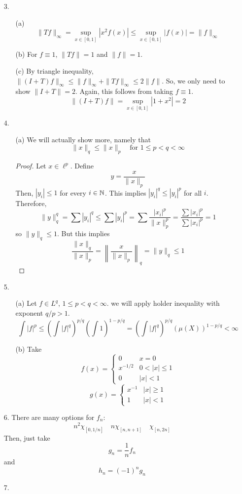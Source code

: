 \begin{itemize}

\item[3.]
	\begin{itemize}
		\item[(a)]
			\[ \|Tf\|_\infty = \sup_{x \in [0,1]} |x^2f(x)| \le \sup_{x \in [0,1]} |f(x)| = \|f\|_\infty \]
		\item[(b)]
			For $f \equiv 1$, $\|Tf\|=1$ and $\|f\|=1$.
		\item[(c)] By triangle inequality, $\|(I+T)f\|_\infty \le \|f\|_\infty + \|Tf\|_\infty \le 2\|f\|$. So, we only need to show $\|I+T\|=2$. Again, this follows from taking $f \equiv 1$.
			\[ \|(I+T)f\| = \sup_{x \in [0,1]} |1+x^2| = 2 \]
	\end{itemize}

\item[4.]
	\begin{itemize}
		\item[(a)] We will actually show more, namely that 
				\[ \|x\|_q \le \|x\|_p \quad \mbox{for } 1 \le p<q<\infty \]
		\begin{proof}
		Let $x \in \ell^p$. Define
			\[ y = \dfrac{x}{\|x\|_p} \]
		Then, $|y_i| \le 1$ for every $i \in \mathbb{N}$. This implies $|y_i|^q \le |y_i|^p$ for all $i$. Therefore,
			\[ \|y\|_q^q =\sum |y_i|^q \le \sum |y_i|^p = \sum \dfrac{|x_i|^p}{\|x\|_p^p} = \dfrac{\sum |x_i|^p}{\sum |x_i|^p} =1\]
		so $\|y\|_q\le1$. But this implies
			\[ \dfrac{\|x\|_q}{\|x\|_p} = \left\| \dfrac{x}{\|x\|_p} \right\|_q = \|y\|_q \le 1 \]
		\end{proof}
	\end{itemize}

\item[5.]
	\begin{itemize}
		\item[(a)] Let $f \in L^q$, $1 \le p < q < \infty$. we will apply holder inequality with exponent $q/p>1$.
		\[ \int |f|^p \le \left(\int |f|^q \right)^{p/q} \left( \int 1 \right)^{1-p/q} = \left( \int |f|^q \right)^{p/q} \left( \mu(X)\right)^{1-p/q} < \infty \]
		\item[(b)] Take
			\[ f(x) = \left\{ \begin{array}{cl} 0 & x=0 \\ x^{-1/2} & 0 <|x| \le 1 \\ 0 & |x| <1 \end{array} \right. \]
			\[ g(x) = \left\{ \begin{array}{cl} x^{-1} & |x| \ge 1 \\ 1 & |x| <1 \end{array} \right.	\]
	\end{itemize}

\item[6.]
	There are many options for $f_n$:
		\[ n^2 \chi_{[0,1/n]} \quad n \chi_{[n,n+1]} \quad \chi_{[n,2n]}\]
	Then, just take
		\[ g_n = \dfrac 1n f_n \]
	and
		\[ h_n = (-1)^n g_n \]

\item[7.]
\end{itemize}